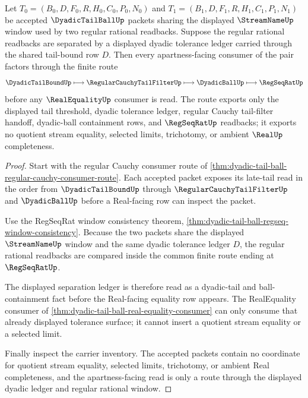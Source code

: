 \begin{theorem}
\label{thm:dyadic-tail-ball-regular-cauchy-apartness-route}
Let $T_0=(B_0,D,F_0,R,H_0,C_0,P_0,N_0)$ and $T_1=(B_1,D,F_1,R,H_1,C_1,P_1,N_1)$ be accepted $\DyadicTailBallUp$ packets sharing the displayed $\StreamNameUp$ window used by two regular rational readbacks. Suppose the regular rational readbacks are separated by a displayed dyadic tolerance ledger carried through the shared tail-bound row $D$. Then every apartness-facing consumer of the pair factors through the finite route
$$
\DyadicTailBoundUp \longmapsto \RegularCauchyTailFilterUp \longmapsto \DyadicBallUp \longmapsto \RegSeqRatUp
$$
before any $\RealEqualityUp$ consumer is read. The route exports only the displayed tail threshold, dyadic tolerance ledger, regular Cauchy tail-filter handoff, dyadic-ball containment rows, and $\RegSeqRatUp$ readbacks; it exports no quotient stream equality, selected limits, trichotomy, or ambient $\RealUp$ completeness.
\end{theorem}
\begin{proof}
Start with the regular Cauchy consumer route of \autoref{thm:dyadic-tail-ball-regular-cauchy-consumer-route}. Each accepted packet exposes its late-tail read in the order from $\DyadicTailBoundUp$ through $\RegularCauchyTailFilterUp$ and $\DyadicBallUp$ before a Real-facing row can inspect the packet.

Use the RegSeqRat window consistency theorem, \autoref{thm:dyadic-tail-ball-regseq-window-consistency}. Because the two packets share the displayed $\StreamNameUp$ window and the same dyadic tolerance ledger $D$, the regular rational readbacks are compared inside the common finite route ending at $\RegSeqRatUp$.

The displayed separation ledger is therefore read as a dyadic-tail and ball-containment fact before the Real-facing equality row appears. The RealEquality consumer of \autoref{thm:dyadic-tail-ball-real-equality-consumer} can only consume that already displayed tolerance surface; it cannot insert a quotient stream equality or a selected limit.

Finally inspect the carrier inventory. The accepted packets contain no coordinate for quotient stream equality, selected limits, trichotomy, or ambient Real completeness, and the apartness-facing read is only a route through the displayed dyadic ledger and regular rational window.
\end{proof}

